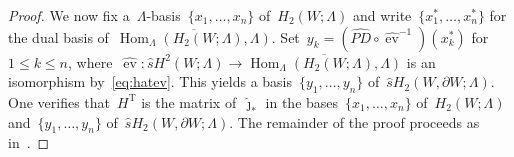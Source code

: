 \documentclass[10.9pt,a4paper]{amsart}
\theoremstyle{definition}
\theoremstyle{remark}
\newcommand{\Bl}{\operatorname{Bl}}
\newcommand{\ev}{\operatorname{ev}}
\newcommand{\Hom}{\operatorname{Hom}}
\newcommand{\that}{\hat{t}}
\newcommand{\shat}{\hat{s}}
\newcommand{\T}{{\operatorname{T}}}
\begin{document}
\begin{proof}
We now fix a~$\Lambda$-basis~$\{ x_1, \ldots, x_n\}$ of~$H_2(W;\Lambda)$ and write~$\{x_1^\ast, \ldots, x_n^\ast\}$ for the dual basis of~$\overline{\Hom_\Lambda(H_2(W;\Lambda),\Lambda)}$.
Set~$y_k=(\hat{PD}\circ\hat{\ev}^{-1})(x^*_k)$ for~$1\le k\le n$,
where~$\hat{\ev}\colon \shat H^2(W; \Lambda)\to\overline{\Hom_\Lambda(H_2(W;\Lambda),\Lambda)}$ is an isomorphism by~\eqref{eq:hatev}. 
This yields a basis~$\{y_1,\dots,y_n\}$ of~$\shat H_2(W,\partial W; \Lambda)$.
One verifies that~$H^{\T}$ is the matrix of~$\hat\jmath_*$ in
the bases~$\{x_1,\ldots,x_n\}$ of~$H_2(W;\Lambda)$
and~$\{y_1,\dots,y_n\}$ of~$\shat H_2(W,\partial W; \Lambda)$.
The remainder of the proof proceeds as in~\cite[Proof of Theorem~1.2]{CFT18}.
%
\end{proof}
\end{document}
